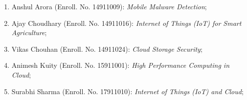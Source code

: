 	\begin{enumerate}
			\item Anshul Arora (Enroll. No. 14911009): \textit{Mobile Malware Detection};
			\item Ajay Choudhary (Enroll. No. 14911016): \textit{Internet of Things (IoT) for Smart Agriculture};
			\item Vikas Chouhan (Enroll. No. 14911024): \textit{Cloud Storage Security};
			\item Animesh Kuity (Enroll. No. 15911001): \textit{High Performance Computing in Cloud};			
			\item Surabhi Sharma (Enroll. No. 17911010): \textit{Internet of Things (IoT) and Cloud};		 
	\end{enumerate}